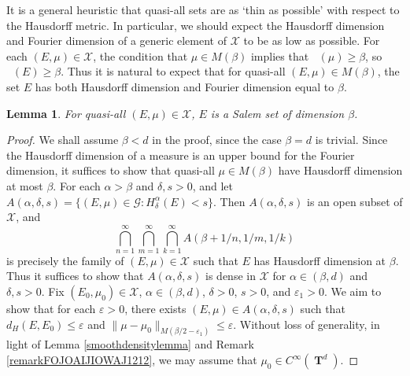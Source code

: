 \documentclass[12pt,reqno]{article}
\numberwithin{equation}{section}
\DeclareMathOperator{\hausdim}{\dim_{\mathbf{H}}}
\DeclareMathOperator{\fordim}{\dim_{\mathbf{F}}}
\DeclareMathOperator{\TT}{\mathbf{T}}
\newtheorem{lemma}{Lemma}
\begin{document}
It is a general heuristic that quasi-all sets are as `thin as possible' with respect to the Hausdorff metric. In particular, we should expect the Hausdorff dimension and Fourier dimension of a generic element of $\mathcal{X}$ to be as low as possible. For each $(E,\mu) \in \mathcal{X}$, the condition that $\mu \in M(\beta)$ implies that $\fordim(\mu) \geq \beta$, so $\fordim(E) \geq \beta$. Thus it is natural to expect that for quasi-all $(E,\mu) \in M(\beta)$, the set $E$ has both Hausdorff dimension and Fourier dimension equal to $\beta$.

\begin{lemma}
    For quasi-all $(E,\mu) \in \mathcal{X}$, $E$ is a Salem set of dimension $\beta$.
\end{lemma}
\begin{proof}
    We shall assume $\beta < d$ in the proof, since the case $\beta = d$ is trivial. Since the Hausdorff dimension of a measure is an upper bound for the Fourier dimension, it suffices to show that quasi-all $\mu \in M(\beta)$ have Hausdorff dimension at most $\beta$. For each $\alpha > \beta$ and $\delta, s > 0$, and let $A(\alpha,\delta,s) = \{ (E,\mu) \in \mathcal{G}: H^\alpha_\delta(E) < s \}$. Then $A(\alpha,\delta,s)$ is an open subset of $\mathcal{X}$, and
    \[ \bigcap_{n = 1}^\infty \bigcap_{m = 1}^\infty \bigcap_{k = 1}^\infty A(\beta + 1/n, 1/m, 1/k) \]
    is precisely the family of $(E,\mu) \in \mathcal{X}$ such that $E$ has Hausdorff dimension at $\beta$.
%
    Thus it suffices to show that $A(\alpha,\delta,s)$ is dense in $\mathcal{X}$ for $\alpha \in (\beta,d)$ and $\delta, s > 0$. Fix $(E_0,\mu_0) \in \mathcal{X}$, $\alpha \in (\beta,d)$, $\delta > 0$, $s > 0$, and $\varepsilon_1 > 0$. We aim to show that for each $\varepsilon > 0$, there exists $(E,\mu) \in A(\alpha,\delta,s)$ such that $d_H(E,E_0) \leq \varepsilon$ and $\| \mu - \mu_0 \|_{M(\beta/2 - \varepsilon_1)} \leq \varepsilon$. Without loss of generality, in light of Lemma \ref{smoothdensitylemma} and Remark \ref{remarkFOJOAIJIOWAJ1212}, we may assume that $\mu_0 \in C^\infty(\TT^d)$.


\end{proof}
\end{document}
